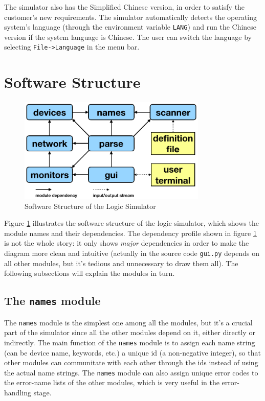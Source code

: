 \documentclass[10pt,a4paper]{article}
\begin{document}
The simulator also has the Simplified Chinese version, in order to
satisfy the customer's new requirements. The simulator automatically
detects the operating system's language (through the environment
variable \texttt{LANG}) and run the Chinese version if the system language is
Chinese. The user can switch the language by selecting
\texttt{File->Language} in the menu bar. 

\section{Software Structure}
\label{sec:org54a3a26}

\begin{figure}[htbp]
\centering
\includegraphics[width=0.8\textwidth]{./figures/dependency.png}
\caption{\label{fig:org34cc76d}
Software Structure of the Logic Simulator}
\end{figure}

Figure \ref{fig:org34cc76d} illustrates the software structure of the logic
simulator, which shows the module names and their dependencies. The
dependency profile shown in figure \ref{fig:org34cc76d} is not the whole
story: it only shows \emph{major} dependencies in order to make the diagram
more clean and intuitive (actually in the source code \texttt{gui.py} depends
on all other modules, but it's tedious and unnecessary to draw them
all). The following subsections will explain the modules in turn.

\subsection{The \texttt{names} module}
\label{sec:org5cab37f}

The \texttt{names} module is the simplest one among all the modules, but it's
a crucial part of the simulator since all the other modules depend on
it, either directly or indirectly. The main function of the \texttt{names}
module is to assign each name string (can be device name, keywords,
etc.) a unique id (a non-negative integer), so that other modules can
communitate with each other through the ids instead of using the
actual name strings. The \texttt{names} module can also assign unique error
codes to the error-name lists of the other modules, which is very
useful in the error-handling stage. 
\end{document}
